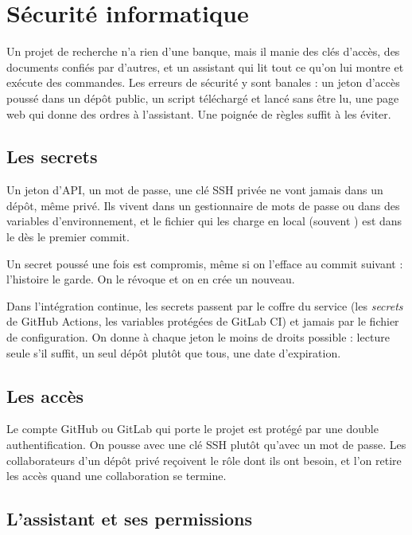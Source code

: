 \chapter{Sécurité informatique}\label{ch:securite}

Un projet de recherche n'a rien d'une banque, mais il manie des clés d'accès, des documents
confiés par d'autres, et un assistant qui lit tout ce qu'on lui montre et exécute des
commandes. Les erreurs de sécurité y sont banales : un jeton d'accès poussé dans un dépôt
public, un script téléchargé et lancé sans être lu, une page web qui donne des ordres à
l'assistant. Une poignée de règles suffit à les éviter.

\section{Les secrets}

Un jeton d'API, un mot de passe, une clé SSH privée ne vont jamais dans un dépôt, même
privé. Ils vivent dans un gestionnaire de mots de passe ou dans des variables
d'environnement, et le fichier qui les charge en local (souvent ) est dans
le  dès le premier commit.

\begin{regle}
Un secret poussé une fois est compromis, même si on l'efface au commit suivant :
l'histoire le garde. On le révoque et on en crée un nouveau.
\end{regle}

Dans l'intégration continue, les secrets passent par le coffre du service (les
\emph{secrets} de GitHub Actions, les variables protégées de GitLab CI) et jamais par le
fichier de configuration. On donne à chaque jeton le moins de droits possible : lecture
seule s'il suffit, un seul dépôt plutôt que tous, une date d'expiration.

\section{Les accès}

Le compte GitHub ou GitLab qui porte le projet est protégé par une double authentification.
On pousse avec une clé SSH plutôt qu'avec un mot de passe. Les collaborateurs d'un dépôt
privé reçoivent le rôle dont ils ont besoin, et l'on retire les accès quand une
collaboration se termine.

\section{L'assistant et ses permissions}

